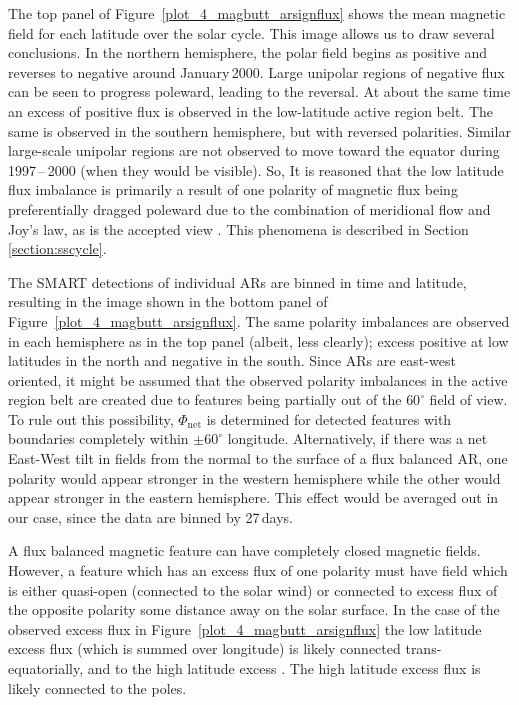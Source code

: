 The top panel of Figure~\ref{plot_4_magbutt_arsignflux} shows the mean magnetic field for each latitude over the solar cycle. This image allows us to draw several conclusions. In the northern hemisphere, the polar field begins as positive and reverses to negative around January\,2000. Large unipolar regions of negative flux can be seen to progress poleward, leading to the reversal. At about the same time an excess of positive flux is observed in the low-latitude active region belt.  The same is observed in the southern hemisphere, but with reversed polarities. Similar large-scale unipolar regions are not observed to move toward the equator during 1997\,--\,2000 (when they would be visible). So, It is reasoned that the low latitude flux imbalance is primarily a result of one polarity of magnetic flux being preferentially dragged poleward due to the combination of meridional flow and Joy's law, as is the accepted view \citep[see][and references therein]{Sheeley:2005}. This phenomena is described in Section\,\ref{section:sscycle}.

The SMART detections of individual ARs are binned in time and latitude, resulting in the image shown in the bottom panel of Figure~\ref{plot_4_magbutt_arsignflux}. The same polarity imbalances are observed in each hemisphere as in the top panel (albeit, less clearly); excess positive at low latitudes in the north and negative in the south. Since \glspl{AR} are east-west oriented, it might be assumed that the observed polarity imbalances in the active region belt are created due to features being partially out of the $60^{\circ}$ field of view. To rule out this possibility, $\Phi_{\mathrm{net}}$ is determined for detected features with boundaries completely within $\pm60^{\circ}$ longitude. Alternatively, if there was a net East-West tilt in fields from the normal to the surface of a flux balanced AR, one polarity would appear stronger in the western hemisphere while the other would appear stronger in the eastern hemisphere. This effect would be averaged out in our case, since the data are binned by 27\,days.

A flux balanced magnetic feature can have completely closed magnetic fields. However, a feature which has an excess flux of one polarity must have field which is either quasi-open (connected to the solar wind) or connected to excess flux of the opposite polarity some distance away on the solar surface. In the case of the observed excess flux in Figure~\ref{plot_4_magbutt_arsignflux} the low latitude excess flux (which is summed over longitude) is likely connected trans-equatorially, and to the high latitude excess \citep{Choudhary:2002}. The high latitude excess flux is likely connected to the poles.


